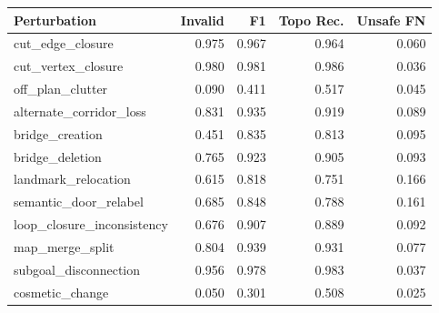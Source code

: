 \begin{tabular}{lrrrr}
\toprule
Perturbation & Invalid & F1 & Topo Rec. & Unsafe FN \\
\midrule
cut\_edge\_closure & 0.975 & 0.967 & 0.964 & 0.060 \\
cut\_vertex\_closure & 0.980 & 0.981 & 0.986 & 0.036 \\
off\_plan\_clutter & 0.090 & 0.411 & 0.517 & 0.045 \\
alternate\_corridor\_loss & 0.831 & 0.935 & 0.919 & 0.089 \\
bridge\_creation & 0.451 & 0.835 & 0.813 & 0.095 \\
bridge\_deletion & 0.765 & 0.923 & 0.905 & 0.093 \\
landmark\_relocation & 0.615 & 0.818 & 0.751 & 0.166 \\
semantic\_door\_relabel & 0.685 & 0.848 & 0.788 & 0.161 \\
loop\_closure\_inconsistency & 0.676 & 0.907 & 0.889 & 0.092 \\
map\_merge\_split & 0.804 & 0.939 & 0.931 & 0.077 \\
subgoal\_disconnection & 0.956 & 0.978 & 0.983 & 0.037 \\
cosmetic\_change & 0.050 & 0.301 & 0.508 & 0.025 \\
\bottomrule
\end{tabular}
